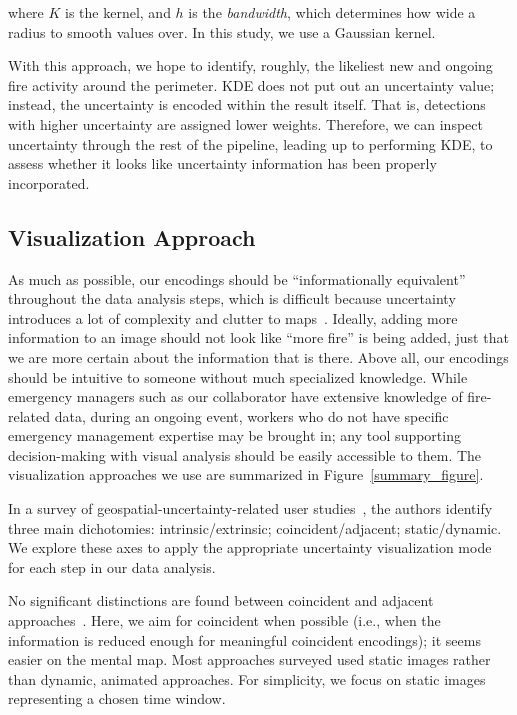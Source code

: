 where $K$ is the kernel, and $h$ is the \textit{bandwidth}, which determines how wide a radius
to smooth values over. In this study, we use a Gaussian kernel.


With this approach, we hope to identify, roughly, the likeliest new and ongoing fire activity around the perimeter. KDE does not put out an uncertainty value; instead, the uncertainty is encoded within the result itself. That is, detections with higher uncertainty are assigned lower weights. Therefore, we can inspect uncertainty through the rest of the pipeline, leading up to performing KDE, to assess whether it looks like uncertainty information has been properly incorporated.



\subsection{Visualization Approach}
\label{visualization}

As much as possible, our encodings should be ``informationally equivalent'' throughout the data analysis steps, which is difficult because uncertainty introduces a lot of complexity and clutter to maps~\cite{Kinkeldey2014b}. Ideally, adding more information to an image should not look like ``more fire'' is being added, just that we are more certain about the information that is there. Above all, our encodings should be intuitive to someone without much specialized knowledge. While emergency managers such as our collaborator have extensive knowledge of fire-related data, during an ongoing event, workers who do not have specific emergency management expertise may be brought in; any tool supporting decision-making with visual analysis should be easily accessible to them. The visualization approaches we use are summarized in Figure~\ref{summary_figure}.

In a survey of geospatial-uncertainty-related user studies~\cite{Kinkeldey2014b}, the authors identify three main dichotomies: intrinsic/extrinsic; coincident/adjacent; static/dynamic. We explore these axes to apply the appropriate uncertainty visualization mode for each step in our data analysis.
 
No significant distinctions are found between coincident and adjacent approaches~\cite{Kinkeldey2014b}. Here, we aim for coincident when possible (i.e., when the information is reduced enough for meaningful coincident encodings); it seems easier on the mental map. Most approaches surveyed used static images rather than dynamic, animated approaches. For simplicity, we focus on static images representing a chosen time window.

